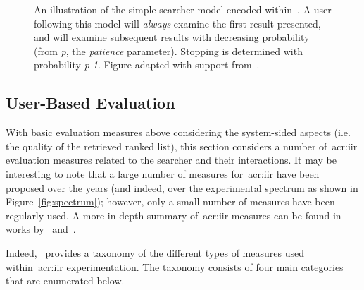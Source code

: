 \begin{figure}[t!]
    \centering
    \caption[Flowchart depicting the searcher model encoded within~\gls{acr:rbp}]{An illustration of the simple searcher model encoded within~. A user following this model will \emph{always} examine the first result presented, and will examine subsequent results with decreasing probability (from \emph{p}, the \emph{patience} parameter). Stopping is determined with probability \emph{p-1}. Figure adapted with support from~\cite{moffat2008rbp}.}
    \label{fig:rbp}
\end{figure}

\subsection{User-Based Evaluation}\label{sec:ir_background:evaluation:user}
With basic evaluation measures above considering the system-sided aspects (i.e. the quality of the retrieved ranked list), this section considers a number of~\gls{acr:iir} evaluation measures related to the searcher and their interactions. It may be interesting to note that a large number of measures for~\gls{acr:iir} have been proposed over the years (and indeed, over the experimental spectrum as shown in Figure~\ref{fig:spectrum}); however, only a small number of measures have been regularly used. A more in-depth summary of~\gls{acr:iir} measures can be found in works by~\cite{su1992iir_measures} and~\cite{kelly2009iir}.

Indeed,~\cite{kelly2009iir} provides a taxonomy of the different types of measures used within~\gls{acr:iir} experimentation. The taxonomy consists of four main categories that are enumerated below.

